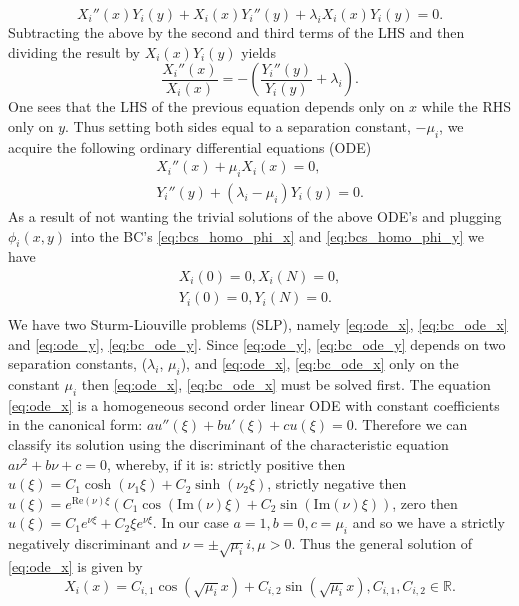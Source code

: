\documentclass[\main/thesis.tex]{subfiles}
\begin{document}
\begin{equation*}
X_i''(x)Y_i(y) {+} X_i(x)Y_i''(y) {+} \lambda_i X_i(x)Y_i(y) {=} 0.
\end{equation*} 
Subtracting the above by the second and third terms of the LHS and then dividing the result by $X_i(x)Y_i(y)$ yields
\begin{equation*}
\frac{X_i''(x)}{X_i(x)} {=} {-}\left(\frac{Y_i''(y)}{Y_i(y)} {+} \lambda_i \right).
\end{equation*}
One sees that the LHS of the previous equation depends only on $x$ while the RHS only on $y$. Thus setting both sides equal to a separation constant, $\minus \mu_i$, we acquire the following ordinary differential equations (ODE)
\begin{align}
X_i''(x) {+} \mu_i X_i(x) {=} 0,
\label{eq:ode_x} \\
Y_i''(y) {+} (\lambda_i {-} \mu_i)Y_i(y) {=} 0.
\label{eq:ode_y}
\end{align}
As a result of not wanting the trivial solutions of the above ODE's and plugging $\phi_i(x, y)$ into the BC's \eqref{eq:bcs_homo_phi_x} and \eqref{eq:bcs_homo_phi_y} we have
\begin{align}
X_i(0) {=} 0, X_i(N) {=} 0,
\label{eq:bc_ode_x}\\
Y_i(0) {=} 0, Y_i(N) {=} 0.
\label{eq:bc_ode_y}\\
\end{align} 
We have two Sturm-Liouville problems (SLP), namely \eqref{eq:ode_x}, \eqref{eq:bc_ode_x} and \eqref{eq:ode_y}, \eqref{eq:bc_ode_y}. Since \eqref{eq:ode_y}, \eqref{eq:bc_ode_y} depends on two separation constants, ($\lambda_i$, $\mu_i$), and \eqref{eq:ode_x}, \eqref{eq:bc_ode_x} only on the constant $\mu_i$ then \eqref{eq:ode_x}, \eqref{eq:bc_ode_x} must be solved first. The equation \eqref{eq:ode_x} is a homogeneous second order linear ODE with constant coefficients in the canonical form: 
$au''(\xi) {+} bu'(\xi) {+} cu(\xi) {=} 0$. Therefore we can classify its solution using the discriminant of the characteristic equation $a\nu^2 {+} b\nu {+} c {=} 0$, whereby, if it is: strictly positive then $u(\xi) {=} C_1\cosh(\nu_1\xi) {+} C_2\sinh(\nu_2\xi)$, strictly negative then $u(\xi) {=} e^{\text{Re}(\nu) \xi}(C_1\cos(\text{Im}(\nu) \xi) {+} C_2\sin(\text{Im}(\nu) \xi))$, zero then $u(\xi) {=} C_1 e^{\nu \xi} + C_2\xi e^{\nu \xi}$.
In our case $a {=} 1, b {=} 0, c {=} \mu_i$ and so we have a strictly negatively discriminant and $\nu {=} {\pm}\sqrt{\mu_i}i, \mu {>} 0$. Thus the general solution of \eqref{eq:ode_x} is given by
\begin{equation*}
X_i(x) {=} C_{i,1}\cos(\sqrt{\mu_i} x) + C_{i,2}\sin(\sqrt{\mu_i} x), C_{i,1}, C_{i,2} {\in} \mathbb{R}.
\end{equation*}
\end{document}
